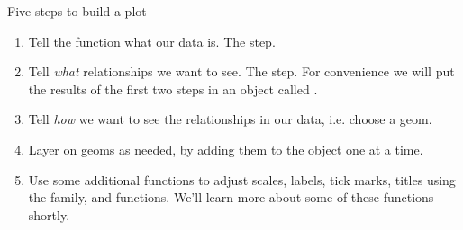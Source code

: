 \documentclass[10pt,handout]{beamer}\usepackage[]{graphicx}\usepackage[]{color}
\begin{document}
\begin{frame}{Five steps to build a plot}
	
\begin{enumerate}
	\item Tell the  function what our data is. The  step.  
\pause	\item  Tell  \textit{what} relationships we want to see. The  step. For convenience we will put the results of the first two steps in an object called .  
\pause	\item  Tell  \textit{how} we want to see the relationships in our data, i.e. choose a geom.  
\pause	\item  Layer on geoms as needed, by adding them to the  object one at a time.  
\pause	\item  Use some additional functions to adjust scales, labels, tick marks, titles using the  family,  and  functions. We'll learn more about some of these functions shortly.  
\end{enumerate}
\end{frame}
\end{document}
